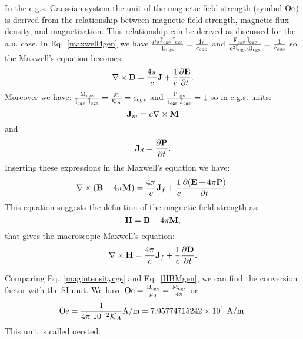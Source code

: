 \documentclass[12pt,a4paper,twoside]{report}
\def\htoh{7.95774715242\times 10^{1}}
\begin{document}
{{\color{orange} In the c.g.s.-Gaussian system the unit of the magnetic field
strength (symbol ${\rm Oe}$) is derived from the relationship between 
magnetic field strength,
magnetic flux density, and magnetization. This relationship can be derived
as discussed for the a.u. case. In Eq.~\ref{maxwell4gen} we have
${\mu_0 {\rm \bar J_{cgs}}\cdot {\rm \bar l_{cgs}} \over {\rm \bar B_{cgs}}}={4 \pi \over c_{cgs}}$
and ${{\rm \bar E_{cgs}}\cdot {\rm \bar l_{cgs}} \over c^2 {\rm \bar t_{cgs}}
\cdot {\rm \bar B_{cgs}}}=
{1\over c_{cgs}}$ so the Maxwell's equation becomes:
\begin{equation}
\nabla \times {\bf B}= {4 \pi \over c} {\bf J} + {1\over c} 
{\partial {\bf E} \over \partial t}.
\label{maxwell4cgs}
\end{equation}
Moreover we have:
${{\rm \bar M_{cgs}} \over {\rm \bar l_{cgs}}\cdot {\rm \bar J_{cgs}}}={\mathcal{K}\over \mathcal{K}_A}=c_{cgs}$ and
${{\rm \bar P_{cgs}} \over {\rm \bar t_{cgs}}\cdot {\rm \bar J_{cgs}}}=1$ so in c.g.s. units:
\begin{equation}
{\bf J}_m= c \nabla \times {\bf M}
\end{equation}
and
\begin{equation}
{\bf J}_d={\partial {\bf P} \over \partial t}.
\end{equation}
Inserting these expressions in the Maxwell's equation we have:
\begin{equation}
\nabla \times ({\bf B} -4\pi {\bf M})= 
{4 \pi\over c} {\bf J}_f +  {1\over c} {\partial ({\bf E}+4\pi {\bf P}) \over \partial t}.
\label{maxwell4cgs1}
\end{equation}
This equation suggests the definition of the magnetic field strength as:
\begin{equation}
{\bf H}={\bf B} -4\pi {\bf M},
\label{magintensitycgs}
\end{equation}
that gives the macroscopic Maxwell's equation:
\begin{equation}
\nabla \times {\bf H}= 
{4 \pi \over c} {\bf J}_f +  {1\over c}{\partial {\bf D} \over \partial t}.
\end{equation}

Comparing Eq.~\ref{magintensitycgs} and Eq.~\ref{HBMgen}, we can find the 
conversion factor with the SI unit.
We have ${\rm Oe}={{\rm \bar B_{cgs}} \over \mu_0}={{\rm \bar M_{cgs}} \over 4 \pi}$ or
\begin{equation}
{\rm Oe}= {1\over 4 \pi\ 10^{-2} \mathcal{K}_A} {\rm A}/{\rm m}=\htoh\ {\rm A}/{\rm m}. 
\end{equation}
This unit is called oersted.
}
\\

}
\end{document}
